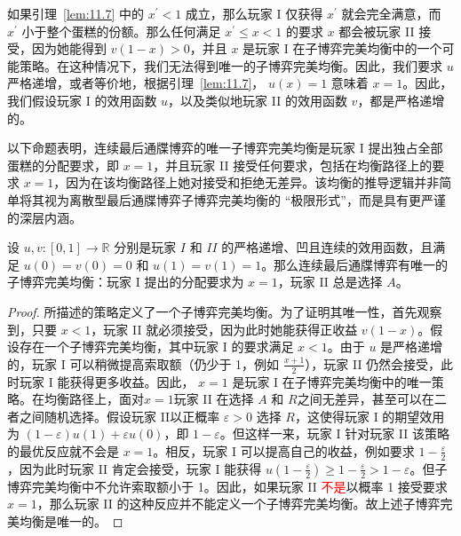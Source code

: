 如果引理~\ref{lem:11.7} 中的 \({x}^{\prime } < 1\) 成立，那么玩家 \(\mathrm{I}\) 仅获得 \({x}^{\prime }\) 就会完全满意，而 \({x}^{\prime }\) 小于整个蛋糕的份额。那么任何满足 \({x}^{\prime } \leq  x < 1\) 的要求 \(x\) 都会被玩家 II 接受，因为她能得到 \(v\left( {1 - x}\right)  > 0\)，并且 \(x\) 是玩家 I 在子博弈完美均衡中的一个可能策略。在这种情况下，我们无法得到唯一的子博弈完美均衡。因此，我们要求 \(u\) 严格递增，或者等价地，根据引理~\ref{lem:11.7}， \(u\left( x\right)  = 1\) 意味着 \(x = 1\)。因此，我们假设玩家 \(\mathrm{I}\) 的效用函数 \(u\)，以及类似地玩家 II 的效用函数 \(v\)，都是严格递增的。

以下命题表明，连续最后通牒博弈的唯一子博弈完美均衡是玩家 I 提出独占全部蛋糕的分配要求，即 \(x = 1\)，并且玩家 II 接受任何要求，包括在均衡路径上的要求 \(x = 1\)，因为在该均衡路径上她对接受和拒绝无差异。该均衡的推导逻辑并非简单将其视为离散型最后通牒博弈子博弈完美均衡的 “极限形式”，而是具有更严谨的深层内涵。

\begin{proposition}\label{prop:11.8}
设 \(u,v : \left\lbrack  {0,1}\right\rbrack   \rightarrow  \mathbb{R}\) 分别是玩家 \(I\) 和 \({II}\) 的严格递增、凹且连续的效用函数，且满足 \(u\left( 0\right)  = v\left( 0\right)  = 0\) 和 \(u\left( 1\right)  = v\left( 1\right)  = 1\)。那么连续最后通牒博弈有唯一的子博弈完美均衡：玩家 I 提出的分配要求为 \(x = 1\)，玩家 II 总是选择 \(A\)。
\end{proposition}

\begin{proof}
所描述的策略定义了一个子博弈完美均衡。为了证明其唯一性，首先观察到，只要 \(x < 1\)，玩家 II 就必须接受，因为此时她能获得正收益 \(v\left( {1 - x}\right)\)。假设存在一个子博弈完美均衡，其中玩家 I 的要求满足 \(x < 1\)。由于 \(u\) 是严格递增的，玩家 I 可以稍微提高索取额（仍少于 1，例如 \(\frac{x + 1}{2}\)），玩家 II 仍然会接受，此时玩家 I 能获得更多收益。因此， \(x = 1\) 是玩家 I 在子博弈完美均衡中的唯一策略。在均衡路径上，面对\(x = 1\)玩家 II 在选择 \(A\) 和 \(R\)之间无差异，甚至可以在二者之间随机选择。假设玩家 II以正概率 \(\varepsilon  > 0\) 选择 \(R\)，这使得玩家 I 的期望效用为 \(\left( {1 - \varepsilon }\right) u\left( 1\right)  + {\varepsilon u}\left( 0\right)\)，即 \(1 - \varepsilon\)。但这样一来，玩家 I 针对玩家 II 该策略的最优反应就不会是 \(x = 1\)。相反，玩家 I 可以提高自己的收益，例如要求 \(1 - \frac{\varepsilon }{2}\)，因为此时玩家 II 肯定会接受，玩家 I 能获得 \(u\left( {1 - \frac{\varepsilon }{2}}\right)  \geq  1 - \frac{\varepsilon }{2} > 1 - \varepsilon\)。但子博弈完美均衡中不允许索取额小于 1。因此，如果玩家 II \textcolor{red}{不是}以概率 1 接受要求 \(x=1\)，那么玩家 II 的这种反应并不能定义一个子博弈完美均衡。故上述子博弈完美均衡是唯一的。
\end{proof}

